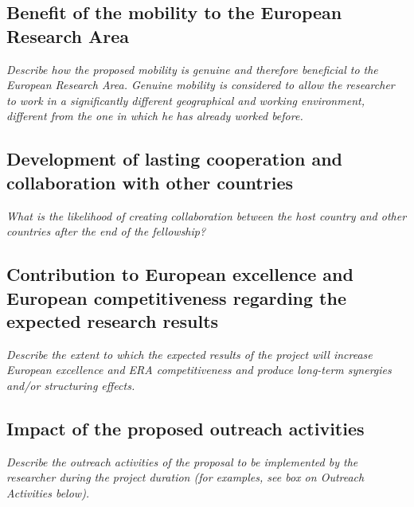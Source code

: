 \documentclass[a4paper,11pt]{article}
\newenvironment{xcomment}{\em}{}
\begin{document}
\subsection{Benefit of the mobility to the European Research Area}
\begin{xcomment}
 Describe how the proposed mobility is genuine and therefore beneficial to the European
Research Area. Genuine mobility is considered to allow the researcher to work in a significantly
different geographical and working environment, different from the one in which he has already
worked before.
\end{xcomment}

\subsection{Development of lasting cooperation and collaboration with other countries}
\begin{xcomment}
 What is the likelihood of creating collaboration between the host country and other countries after
the end of the fellowship?
\end{xcomment}

\subsection{Contribution to European excellence and European competitiveness regarding the expected research results}
\begin{xcomment}
Describe the extent to which the expected results of the project will increase European
excellence and ERA competitiveness and produce long-term synergies and/or structuring effects. 
\end{xcomment}

\subsection{Impact of the proposed outreach activities}
\begin{xcomment}
 Describe the outreach activities of the proposal to be implemented by the researcher during the
project duration (for examples, see box on Outreach Activities below).
\end{xcomment}

\newpage


\end{document}
